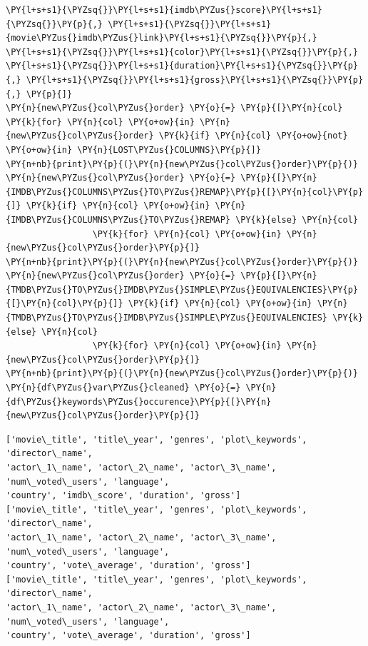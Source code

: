 \begin{tcolorbox}[breakable, size=fbox, boxrule=1pt, pad at break*=1mm,colback=cellbackground, colframe=cellborder]
\begin{Verbatim}[commandchars=\\\{\}]
                 \PY{l+s+s1}{\PYZsq{}}\PY{l+s+s1}{imdb\PYZus{}score}\PY{l+s+s1}{\PYZsq{}}\PY{p}{,} \PY{l+s+s1}{\PYZsq{}}\PY{l+s+s1}{movie\PYZus{}imdb\PYZus{}link}\PY{l+s+s1}{\PYZsq{}}\PY{p}{,} \PY{l+s+s1}{\PYZsq{}}\PY{l+s+s1}{color}\PY{l+s+s1}{\PYZsq{}}\PY{p}{,} \PY{l+s+s1}{\PYZsq{}}\PY{l+s+s1}{duration}\PY{l+s+s1}{\PYZsq{}}\PY{p}{,} \PY{l+s+s1}{\PYZsq{}}\PY{l+s+s1}{gross}\PY{l+s+s1}{\PYZsq{}}\PY{p}{,} \PY{p}{]}
\PY{n}{new\PYZus{}col\PYZus{}order} \PY{o}{=} \PY{p}{[}\PY{n}{col} \PY{k}{for} \PY{n}{col} \PY{o+ow}{in} \PY{n}{new\PYZus{}col\PYZus{}order} \PY{k}{if} \PY{n}{col} \PY{o+ow}{not} \PY{o+ow}{in} \PY{n}{LOST\PYZus{}COLUMNS}\PY{p}{]}
\PY{n+nb}{print}\PY{p}{(}\PY{n}{new\PYZus{}col\PYZus{}order}\PY{p}{)}
\PY{n}{new\PYZus{}col\PYZus{}order} \PY{o}{=} \PY{p}{[}\PY{n}{IMDB\PYZus{}COLUMNS\PYZus{}TO\PYZus{}REMAP}\PY{p}{[}\PY{n}{col}\PY{p}{]} \PY{k}{if} \PY{n}{col} \PY{o+ow}{in} \PY{n}{IMDB\PYZus{}COLUMNS\PYZus{}TO\PYZus{}REMAP} \PY{k}{else} \PY{n}{col}
                 \PY{k}{for} \PY{n}{col} \PY{o+ow}{in} \PY{n}{new\PYZus{}col\PYZus{}order}\PY{p}{]}
\PY{n+nb}{print}\PY{p}{(}\PY{n}{new\PYZus{}col\PYZus{}order}\PY{p}{)}
\PY{n}{new\PYZus{}col\PYZus{}order} \PY{o}{=} \PY{p}{[}\PY{n}{TMDB\PYZus{}TO\PYZus{}IMDB\PYZus{}SIMPLE\PYZus{}EQUIVALENCIES}\PY{p}{[}\PY{n}{col}\PY{p}{]} \PY{k}{if} \PY{n}{col} \PY{o+ow}{in} \PY{n}{TMDB\PYZus{}TO\PYZus{}IMDB\PYZus{}SIMPLE\PYZus{}EQUIVALENCIES} \PY{k}{else} \PY{n}{col}
                 \PY{k}{for} \PY{n}{col} \PY{o+ow}{in} \PY{n}{new\PYZus{}col\PYZus{}order}\PY{p}{]}
\PY{n+nb}{print}\PY{p}{(}\PY{n}{new\PYZus{}col\PYZus{}order}\PY{p}{)}
\PY{n}{df\PYZus{}var\PYZus{}cleaned} \PY{o}{=} \PY{n}{df\PYZus{}keywords\PYZus{}occurence}\PY{p}{[}\PY{n}{new\PYZus{}col\PYZus{}order}\PY{p}{]}
\end{Verbatim}
\end{tcolorbox}

    \begin{Verbatim}[commandchars=\\\{\}]
['movie\_title', 'title\_year', 'genres', 'plot\_keywords', 'director\_name',
'actor\_1\_name', 'actor\_2\_name', 'actor\_3\_name', 'num\_voted\_users', 'language',
'country', 'imdb\_score', 'duration', 'gross']
['movie\_title', 'title\_year', 'genres', 'plot\_keywords', 'director\_name',
'actor\_1\_name', 'actor\_2\_name', 'actor\_3\_name', 'num\_voted\_users', 'language',
'country', 'vote\_average', 'duration', 'gross']
['movie\_title', 'title\_year', 'genres', 'plot\_keywords', 'director\_name',
'actor\_1\_name', 'actor\_2\_name', 'actor\_3\_name', 'num\_voted\_users', 'language',
'country', 'vote\_average', 'duration', 'gross']
\end{Verbatim}

